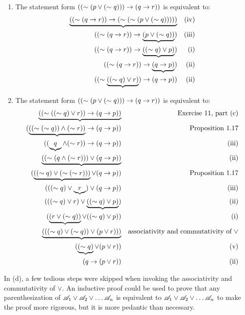 \begin{enumerate}
\begin{enumerate}
      \item The statement form \(((\sim(p \lor (\sim q))) \rightarrow (q \rightarrow r))\) is equivalent to:
        \begin{align*}
          \underbrace{((\sim(q \rightarrow r)) \rightarrow (\sim(\sim(p \lor (\sim q)))))}&&
          \text{(iv)}\\
          ((\sim(q \rightarrow r)) \rightarrow \underbrace{(p \lor (\sim q))})&&
          \text{(iii)}\\
          ((\sim(q \rightarrow r)) \rightarrow \underbrace{((\sim q) \lor p)})&&
          \text{(i)}\\
          ((\sim(q \rightarrow r)) \rightarrow \underbrace{(q \rightarrow p)})&&
          \text{(ii)}\\
          ((\sim\underbrace{((\sim q) \lor r)}) \rightarrow (q \rightarrow p))&&
          \text{(ii)}
        \end{align*}

      \item The statement form \(((\sim(p \lor (\sim q))) \rightarrow (q \rightarrow r))\) is equivalent to:
        \begin{align*}
          \underbrace{((\sim((\sim q) \lor r)) \rightarrow (q \rightarrow p))}&&
          \text{Exercise 11, part (c)}\\
          (\underbrace{((\sim(\sim q)) \land (\sim r))} \rightarrow (q \rightarrow p))&&
          \text{Proposition 1.17}\\
          ((\underbrace{q} \land (\sim r)) \rightarrow (q \rightarrow p))&&
          \text{(iii)}\\
          \underbrace{((\sim(q \land (\sim r))) \lor (q \rightarrow p))}&&
          \text{(ii)}\\
          (\underbrace{((\sim q) \lor (\sim(\sim r)))} \lor (q \rightarrow p))&&
          \text{Proposition 1.17}\\
          (((\sim q) \lor \underbrace{r}) \lor (q \rightarrow p))&&
          \text{(iii)}\\
          (((\sim q) \lor r) \lor \underbrace{((\sim q) \lor p)})&&
          \text{(ii)}\\
          (\underbrace{(r \lor (\sim q))} \lor ((\sim q) \lor p))&&
          \text{(i)}\\
          \underbrace{(((\sim q) \lor (\sim q)) \lor (p \lor r)))}&&
          \text{associativity and commutativity of \(\lor\)}\\
          (\underbrace{(\sim q)} \lor (p \lor r))&&
          \text{(v)}\\
          (q \rightarrow (p \lor r))&&
          \text{(ii)}
        \end{align*}
    \end{enumerate}

    \note{} In (d), a few tedious steps were skipped when invoking the associativity and commutativity of \(\lor\). An inductive proof could be used to prove that any parenthesization of \(\mathscr{A}_1 \lor \mathscr{A}_2 \lor \dots \mathscr{A}_n\) is equivalent to \(\mathscr{A}_1 \lor \mathscr{A}_2 \lor \dots \mathscr{A}_n\) to make the proof more rigorous, but it is more pedantic than necessary.
\end{enumerate}
